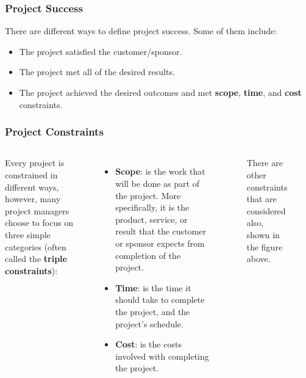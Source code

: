 \documentclass{beamer}
\begin{document}
\begin{frame}
\frametitle{Project Success}
There are different ways to define project success. Some of them include:
\begin{itemize}
\item The project satisfied the customer/sponsor.
\item The project met all of the desired results.
\item The project achieved the desired outcomes and met \textbf{scope}, \textbf{time}, and \textbf{cost} constraints. 
\end{itemize}
\end{frame}

\begin{frame}
\frametitle{Project Constraints}
\begin{columns}
 \small
Every project is constrained in different ways, however, many project managers choose to focus on three simple categories (often called the \textbf{triple constraints}):
\begin{itemize} \small
\item \textbf{Scope}: is the work that will be done as part of the project. More specifically, it is the product, service, or result that the customer or sponsor expects from completion of the project.
\item \textbf{Time}: is the time it should take to complete the project, and the project's schedule.
\item \textbf{Cost}: is the costs involved with completing the project.
\end{itemize}
\begin{figure}
\caption{There are other constraints that are considered also, shown in the figure above.}
\end{figure}
\end{columns}
\end{frame}
\end{document}
